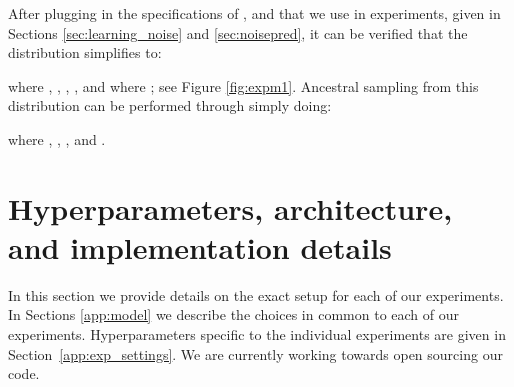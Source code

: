 \documentclass{article}
\begin{document}
After plugging in the specifications of ,  and  that we use in experiments, given in Sections \ref{sec:learning_noise} and \ref{sec:noisepred}, it can be verified that the distribution  simplifies to:

where , , , , and where ; see Figure \ref{fig:expm1}. Ancestral sampling from this distribution can be performed through simply doing:

where , , , and .

\section{Hyperparameters, architecture, and implementation details}
\label{sec:hps}
In this section we provide details on the exact setup for each of our experiments. In Sections \ref{app:model} we describe the choices in common to each of our experiments. Hyperparameters specific to the individual experiments are given in Section~\ref{app:exp_settings}. We are currently working towards open sourcing our code.
\end{document}
